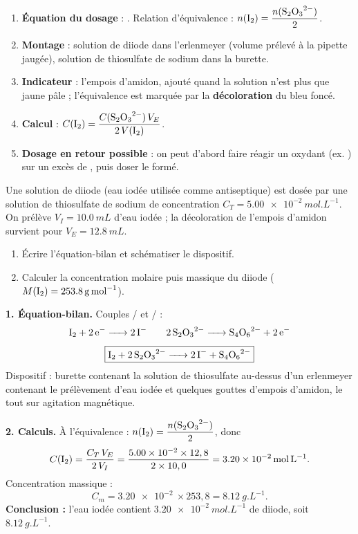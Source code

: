 \documentclass[11pt]{article}
\begin{document}
\begin{methode}
\begin{enumerate}
\item \textbf{Équation du dosage} : . Relation d'équivalence : $n(\ce{I2})=\dfrac{n(\ce{S2O3^2-})}{2}$.
\item \textbf{Montage} : solution de diiode dans l'erlenmeyer (volume prélevé à la pipette jaugée), solution de thiosulfate de sodium dans la burette.
\item \textbf{Indicateur} : l'empois d'amidon, ajouté quand la solution n'est plus que jaune pâle ; l'équivalence est marquée par la \textbf{décoloration} du bleu foncé.
\item \textbf{Calcul} : $C(\ce{I2})=\dfrac{C(\ce{S2O3^2-})\,V_{E}}{2\,V(\ce{I2})}$.
\item \textbf{Dosage en retour possible} : on peut d'abord faire réagir un oxydant (ex. ) sur un excès de , puis doser le  formé.
\end{enumerate}
\end{methode}

\begin{exoresolu}
Une solution de diiode (eau iodée utilisée comme antiseptique) est dosée par une solution de thiosulfate de sodium de concentration $C_{T}=\SI{5,00e-2}{mol.L^{-1}}$. On prélève $V_{I}=\SI{10,0}{mL}$ d'eau iodée ; la décoloration de l'empois d'amidon survient pour $V_{E}=\SI{12,8}{mL}$.
\begin{enumerate}
\item Écrire l'équation-bilan et schématiser le dispositif.
\item Calculer la concentration molaire puis massique du diiode ($M(\ce{I2})=\SI{253,8}{g.mol^{-1}}$).
\end{enumerate}
\tcblower
\textbf{1. Équation-bilan.} Couples / et / :
\[
\ce{I2 + 2e- -> 2I-} \qquad \ce{2S2O3^2- -> S4O6^2- + 2e-}
\]
\[
\boxed{\ce{I2 + 2S2O3^2- -> 2I- + S4O6^2-}}
\]
Dispositif : burette contenant la solution de thiosulfate au-dessus d'un erlenmeyer contenant le prélèvement d'eau iodée et quelques gouttes d'empois d'amidon, le tout sur agitation magnétique.

\textbf{2. Calculs.} À l'équivalence : $n(\ce{I2})=\dfrac{n(\ce{S2O3^2-})}{2}$, donc
\[
C(\ce{I2})=\frac{C_{T}\,V_{E}}{2\,V_{I}}
=\frac{\SI{5,00e-2}{}\times 12,8}{2\times 10,0}
=\SI{3,20e-2}{mol.L^{-1}}.
\]
Concentration massique :
\[
C_{m}=\SI{3,20e-2}{}\times 253,8=\SI{8,12}{g.L^{-1}}.
\]
\textbf{Conclusion :} l'eau iodée contient $\SI{3,20e-2}{mol.L^{-1}}$ de diiode, soit $\SI{8,12}{g.L^{-1}}$.
\end{exoresolu}
\end{document}
